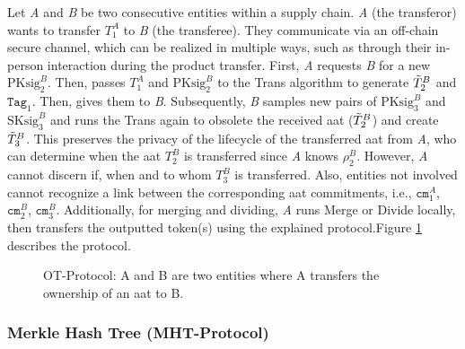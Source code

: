 Let \textit{A} and \textit{B} be two consecutive entities within a supply chain. \textit{A} (the transferor) wants to transfer $T^A_1$ to \textit{B} (the transferee). They communicate via an off-chain secure channel, which can be realized in multiple ways, such as through their in-person interaction during the product transfer. First, \textit{A} requests \textit{B} for a new $\text{PKsig}^B_2$. Then, passes $T^A_1$ and $\text{PKsig}^B_2$ to the \textsf{Trans} algorithm to generate $\Tilde{T}^B_2$ and $\texttt{Tag}_1$. Then, gives them to \textit{B}. Subsequently, \textit{B} samples  new pairs of $\text{PKsig}^B_3$ and $\text{SKsig}^B_3$ and runs the \textsf{Trans} again to obsolete the received \gls{aat} ($\Tilde{T}^B_2$) and create $\Tilde{T}^B_3$. This preserves the privacy of the lifecycle of the transferred \gls{aat} from \textit{A}, who can determine when the \gls{aat} $T_2^B$ is transferred since \textit{A} knows $\rho_2^B$. However, \textit{A} cannot discern if, when and to whom $T_3^B$ is transferred. Also, entities not involved cannot recognize a link between the corresponding \gls{aat} commitments, i.e., $\texttt{cm}^A_1$, $\texttt{cm}^B_2$, $\texttt{cm}^B_3$. Additionally, for merging and dividing, \textit{A} runs \textsf{Merge} or \textsf{Divide} locally, then transfers the outputted token(s) using the explained protocol.Figure \ref{fig:Ownership Transfer} describes the protocol.

\begin{figure}[h]
    \centering
    {
    
    }
    \vspace{-5pt} 
    \caption[Anonymous authentication token ownership transfer protocol]{\textsf{OT-Protocol}: A and B are two entities where A transfers the ownership of an \gls{aat} to B.}
    \label{fig:Ownership Transfer}
\end{figure}

\newpage

\subsubsection{Merkle Hash Tree (\textsf{MHT-Protocol})}
\label{sec:MerkleTreeStructure}


